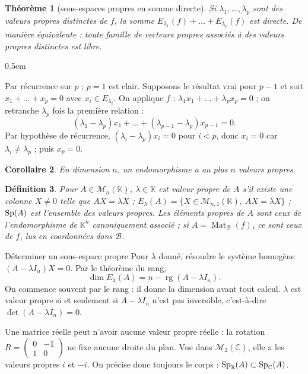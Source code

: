 \documentclass[a4paper,11pt]{article}
\makeatletter
\numberwithin{equation}{section}
\numberwithin{figure}{section}
\numberwithin{table}{section}
\theoremstyle{enonce}
\newtheorem{definition}{Définition}[section]
\newtheorem{theoreme}[definition]{Théorème}
\newtheorem{corollaire}[definition]{Corollaire}
\theoremstyle{exemple}
\theoremstyle{remarque}
\renewcommand{\proofname}{Démonstration}
\renewenvironment{proof}[1][\proofname]{\par\pushQED{\qed}\normalfont
  \topsep0.5em\relax\trivlist\item[\hskip\labelsep\sffamily\itshape\color{Gris}#1.]\ignorespaces}
  {\popQED\endtrivlist\@endpefalse}
\newcommand{\K}{\mathbb{K}}
\newcommand{\R}{\mathbb{R}}
\newcommand{\C}{\mathbb{C}}
\newcommand{\Mn}[1]{\mathcal{M}_{n}(#1)}
\newcommand{\rg}{\operatorname{rg}}
\newcommand{\Mat}{\operatorname{Mat}}
\makeatother
\begin{document}
\begin{theoreme}[sous-espaces propres en somme directe]\label{t:somme-propres}
Si $\lambda_1,\dots,\lambda_p$ sont des valeurs propres \emph{distinctes} de $f$, la somme $E_{\lambda_1}(f)+\dots+E_{\lambda_p}(f)$
est directe. De manière équivalente : toute famille de vecteurs propres associés à des valeurs propres distinctes est libre.
\end{theoreme}

\begin{proof}
Par récurrence sur $p$ ; $p=1$ est clair. Supposons le résultat vrai pour $p-1$ et soit $x_1+\dots+x_p=0$ avec $x_i\in E_{\lambda_i}$.
On applique $f$ : $\lambda_1x_1+\dots+\lambda_px_p=0$ ; on retranche $\lambda_p$ fois la première relation :
\[(\lambda_1-\lambda_p)x_1+\dots+(\lambda_{p-1}-\lambda_p)x_{p-1}=0.\]
Par hypothèse de récurrence, $(\lambda_i-\lambda_p)x_i=0$ pour $i<p$, donc $x_i=0$ car $\lambda_i\neq\lambda_p$ ; puis $x_p=0$.
\end{proof}

\begin{corollaire}\label{c:n-valeurs}
En dimension $n$, un endomorphisme a au plus $n$ valeurs propres.
\end{corollaire}

\begin{definition}
Pour $A\in\Mn{\K}$, $\lambda\in\K$ est valeur propre de $A$ s'il existe une colonne $X\neq0$ telle que $AX=\lambda X$ ;
$E_\lambda(A)=\{X\in\mathcal M_{n,1}(\K),\ AX=\lambda X\}$ ; $\operatorname{Sp}(A)$ est l'ensemble des valeurs propres.
Les éléments propres de $A$ sont ceux de l'endomorphisme de $\K^n$ canoniquement associé ; si $A=\Mat_{\mathcal B}(f)$, ce sont
ceux de $f$, lus en coordonnées dans $\mathcal B$.
\end{definition}

\begin{methode}{Déterminer un sous-espace propre}\label{m:sep}
Pour $\lambda$ donné, résoudre le système homogène $(A-\lambda I_n)X=0$. Par le théorème du rang,
\[\dim E_\lambda(A)=n-\rg(A-\lambda I_n).\]
On commence souvent par le rang : il donne la dimension avant tout calcul. $\lambda$ est valeur propre si et seulement si
$A-\lambda I_n$ n'est pas inversible, c'est-à-dire $\det(A-\lambda I_n)=0$.
\end{methode}

\begin{attention}
Une matrice réelle peut n'avoir aucune valeur propre réelle : la rotation $R=\begin{pmatrix}0&-1\\1&0\end{pmatrix}$ ne fixe aucune
droite du plan. Vue dans $\mathcal M_2(\C)$, elle a les valeurs propres $i$ et $-i$. On précise donc toujours le corps :
$\Sp_\R(A)\subset\Sp_\C(A)$.
\end{attention}
\end{document}
